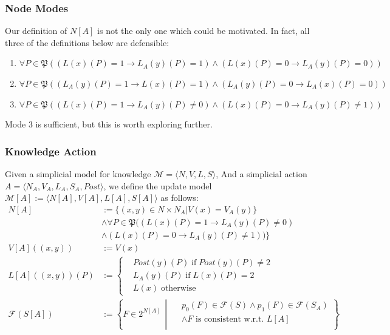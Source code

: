 \documentclass{beamer}
\begin{document}
\begin{frame}[fragile]
	\frametitle{Node Modes}
	Our definition of $N[A]$ is not the only one which could be motivated. In fact, all three of the definitions below are defensible:
	
	\begin{enumerate}
		\item $\forall P\in\mathfrak{P}((L(x)(P)=1\rightarrow L_A(y)(P)=1)\wedge(L(x)(P)=0\rightarrow L_A(y)(P)=0))$
		\item $\forall P\in\mathfrak{P}((L_A(y)(P)=1\rightarrow L(x)(P)=1)\wedge(L_A(y)(P)=0\rightarrow L_A(x)(P)=0))$
		\item $\forall P\in\mathfrak{P}((L(x)(P)=1\rightarrow L_A(y)(P)\neq 0)\wedge(L(x)(P)=0\rightarrow L_A(y)(P)\neq 1))$
	\end{enumerate}
	
	Mode 3 is sufficient, but this is worth exploring further.
\end{frame}

\begin{frame}[fragile]
	\frametitle{Knowledge Action}
	\begin{definition}
		Given a simplicial model for knowledge $\mathcal{M}=\langle N,V,L,S\rangle$, And a simplicial action $A=\langle N_A,V_A,L_A,S_A,Post\rangle$, we define the update model $\mathcal{M}[A]:=\langle N[A],V[A],L[A],S[A]\rangle$ as follows:
		\begin{align*}
			N[A]&:=\{(x,y)\in N\times N_A|V(x)=V_A(y)\}\\
			&\wedge\forall P\in\mathfrak{P}((L(x)(P)=1\rightarrow L_A(y)(P)\neq 0)\\
			&\wedge(L(x)(P)=0\rightarrow L_A(y)(P)\neq 1))\}
			\\ V[A]((x,y))&:=V(x)
			\\ L[A]((x,y))(P)&:=\begin{cases}
				& Post(y)(P)\;\text{if}\;Post(y)(P)\neq 2 \\
				& L_A(y)(P)\;\text{if}\;L(x)(P)=2 \\
				&L(x)\;\text{otherwise}
			\end{cases} 
			\\ \mathcal{F}(S[A])&:=\left \{F\in 2^{N[A]}~\middle |~\begin{matrix}
				& p_0(F)\in\mathcal{F}(S)\wedge p_1(F)\in\mathcal{F}(S_A) \\
				& \wedge F\text{ is consistent w.r.t. }L[A] \\
			\end{matrix} \right \}
		\end{align*}
	\end{definition}
\end{frame}
\end{document}
